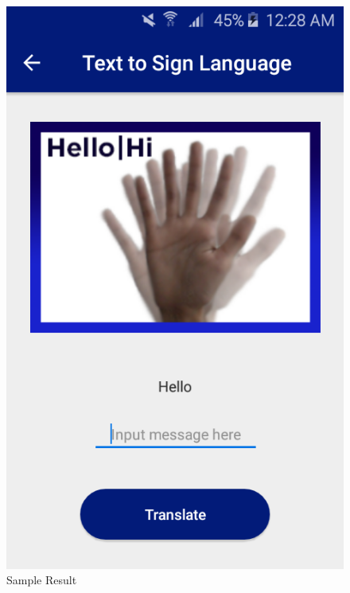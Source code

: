 \documentclass[journal]{./IEEE/IEEEtran}
\begin{document}
\begin{figure}[ht!]
    \centering
    \includegraphics[width=0.75\linewidth]{./images/screen_tts_result.png}
    \caption{Sample Result}
    \label{fig:tts_result}
\end{figure}
\end{document}
